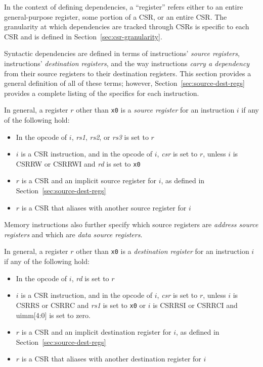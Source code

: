 In the context of defining dependencies, a ``register'' refers either to an entire general-purpose register, some portion of a CSR, or an entire CSR.  The granularity at which dependencies are tracked through CSRs is specific to each CSR and is defined in Section~\ref{sec:csr-granularity}.

Syntactic dependencies are defined in terms of instructions' {\em source registers}, instructions' {\em destination registers}, and the way instructions {\em carry a dependency} from their source registers to their destination registers.
This section provides a general definition of all of these terms; however, Section~\ref{sec:source-dest-regs} provides a complete listing of the specifics for each instruction.

In general, a register $r$ other than {\tt x0} is a {\em source register} for an instruction $i$ if any of the following hold:
\begin{itemize}
  \item In the opcode of $i$, {\em rs1}, {\em rs2}, or {\em rs3} is set to $r$
  \item $i$ is a CSR instruction, and in the opcode of $i$, {\em csr} is set to $r$, unless $i$ is CSRRW or CSRRWI and {\em rd} is set to {\tt x0}
  \item $r$ is a CSR and an implicit source register for $i$, as defined in Section~\ref{sec:source-dest-regs}
  \item $r$ is a CSR that aliases with another source register for $i$
\end{itemize}
Memory instructions also further specify which source registers are {\em address source registers} and which are {\em data source registers}.

In general, a register $r$ other than {\tt x0} is a {\em destination register} for an instruction $i$ if any of the following hold:
\begin{itemize}
  \item In the opcode of $i$, {\em rd} is set to $r$
  \item $i$ is a CSR instruction, and in the opcode of $i$, {\em csr} is set to $r$, unless $i$ is CSRRS or CSRRC and {\em rs1} is set to {\tt x0} or $i$ is CSRRSI or CSRRCI and uimm[4:0] is set to zero.
  \item $r$ is a CSR and an implicit destination register for $i$, as defined in Section~\ref{sec:source-dest-regs}
  \item $r$ is a CSR that aliases with another destination register for $i$
\end{itemize}

